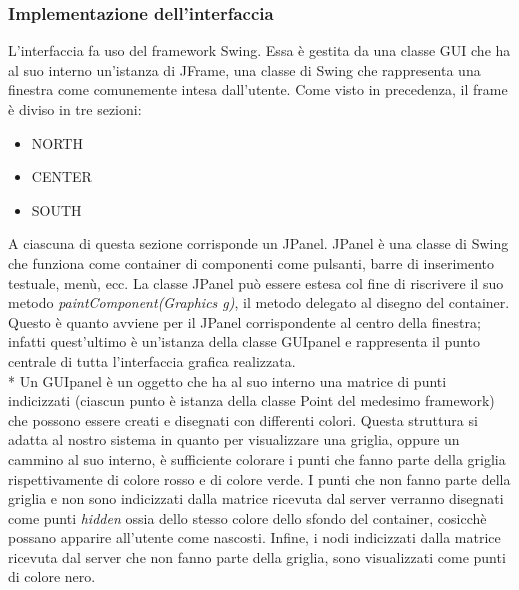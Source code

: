  \subsubsection{Implementazione dell'interfaccia}
 L'interfaccia fa uso del framework Swing. Essa \`e gestita da una classe GUI che ha al suo interno un'istanza di JFrame, una classe di Swing che rappresenta una finestra come comunemente intesa dall'utente. Come visto in precedenza, il frame \`e diviso in tre sezioni:
 \begin{itemize}
 	\item NORTH
 	\item CENTER
 	\item SOUTH
 \end{itemize}
A ciascuna di questa sezione corrisponde un JPanel. JPanel \`e una classe di Swing che funziona come container di componenti come pulsanti, barre di inserimento testuale, men\`u, ecc. La classe JPanel pu\`o essere estesa col fine di riscrivere il suo metodo \emph{paintComponent(Graphics g)}, il metodo delegato al disegno del container. Questo \`e quanto avviene per il JPanel corrispondente al centro della finestra; infatti quest'ultimo \`e un'istanza della classe GUIpanel e rappresenta il punto centrale di tutta l'interfaccia grafica realizzata.\\*
Un GUIpanel \`e un oggetto che ha al suo interno una matrice di punti indicizzati (ciascun punto \`e istanza della classe Point del medesimo framework) che possono essere creati e disegnati con differenti colori. Questa struttura si adatta al nostro sistema in quanto per visualizzare una griglia, oppure un cammino al suo interno, \`e sufficiente colorare i punti che fanno parte della griglia rispettivamente di colore rosso e di colore verde. I punti che non fanno parte della griglia e non sono indicizzati dalla matrice ricevuta dal server verranno disegnati come punti \emph{hidden} ossia dello stesso colore dello sfondo del container, cosicch\`e possano apparire all'utente come nascosti. Infine, i nodi indicizzati dalla matrice ricevuta dal server che non fanno parte della griglia, sono visualizzati come punti di colore nero.



